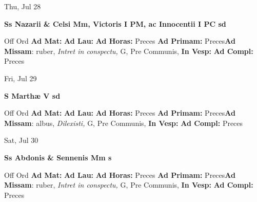 \documentclass[10pt]{book}
\begin{document}
\begin{center}
\begin{minipage}{3.5in}
\vspace{2em}
\begin{center}Thu, Jul 28
\end{center}
\textbf{ \large Ss Nazarii \& Celsi Mm, Victoris I PM, ac Innocentii I PC
\textnormal{\normalsize sd}}

\begin{justify}Off Ord
\textbf{Ad Mat: }
\textbf{Ad Lau: }
\textbf{Ad Horas: }Preces
\textbf{Ad Primam: }Preces\textbf{Ad Missam}: ruber, \textit{Intret in conspectu,} G, Pre Communis, 
\textbf{In Vesp: }
\textbf{Ad Compl: }Preces
\end{justify}
\end{minipage}
\end{center}

\begin{center}
\begin{minipage}{3.5in}
\vspace{2em}
\begin{center}Fri, Jul 29
\end{center}
\textbf{ \large S Marthæ V
\textnormal{\normalsize sd}}

\begin{justify}Off Ord
\textbf{Ad Mat: }
\textbf{Ad Lau: }
\textbf{Ad Horas: }Preces
\textbf{Ad Primam: }Preces\textbf{Ad Missam}: albus, \textit{Dilexisti,} G, Pre Communis, 
\textbf{In Vesp: }
\textbf{Ad Compl: }Preces
\end{justify}
\end{minipage}
\end{center}

\begin{center}
\begin{minipage}{3.5in}
\vspace{2em}
\begin{center}Sat, Jul 30
\end{center}
\textbf{ \large Ss Abdonis \& Sennenis Mm
\textnormal{\normalsize s}}

\begin{justify}Off Ord
\textbf{Ad Mat: }
\textbf{Ad Lau: }
\textbf{Ad Horas: }Preces
\textbf{Ad Primam: }Preces\textbf{Ad Missam}: ruber, \textit{Intret in conspectu,} G, Pre Communis, 
\textbf{In Vesp: }
\textbf{Ad Compl: }Preces
\end{justify}
\end{minipage}
\end{center}
\end{document}

